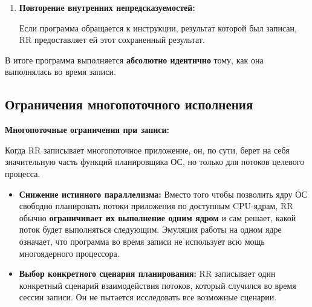 \begin{itemize}
\begin{enumerate}
\begin{itemize}
      \end{itemize}

    \item \textbf{Повторение внутренних непредсказуемостей:}

      Если программа обращается к инструкции, результат которой был записан, RR предоставляет ей этот сохраненный результат.

    \end{enumerate}

    В итоге программа выполняется \textbf{абсолютно идентично} тому, как она
    выполнялась во время записи.

\end{itemize}

\subsection{Ограничения многопоточного исполнения}




\textbf{Многопоточные ограничения при записи:}

Когда RR записывает многопоточное приложение, он, по сути, берет на себя
значительную часть функций планировщика ОС, но только для потоков целевого
процесса.
\begin{itemize}

  \item \textbf{Снижение истинного параллелизма:} Вместо того чтобы позволить
  ядру ОС свободно планировать потоки приложения по доступным CPU-ядрам, RR
  обычно \textbf{ограничивает их выполнение одним ядром} и сам решает, какой
  поток будет выполняться следующим. Эмуляция работы на одном ядре означает,
  что программа во время записи не использует всю мощь многоядерного
  процессора.

  \item \textbf{Выбор конкретного сценария планирования:} RR записывает один
  конкретный сценарий взаимодействия потоков, который случился во время сессии
  записи. Он не пытается исследовать все возможные сценарии.

\end{itemize}

